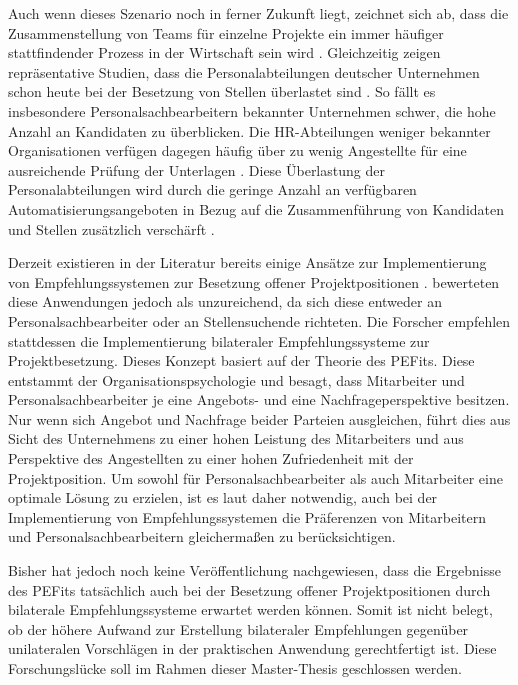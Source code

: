 Auch wenn dieses Szenario noch in ferner Zukunft liegt, zeichnet sich ab, dass die Zusammenstellung von Teams für einzelne Projekte ein immer häufiger stattfindender Prozess in der Wirtschaft sein wird \cite[S. 2]{malinowski:2008}. Gleichzeitig zeigen repräsentative Studien, dass die Personalabteilungen deutscher Unternehmen schon heute bei der Besetzung von Stellen überlastet sind \cite[S. 244]{personalbeschaffung:2017}. So fällt es insbesondere Personalsachbearbeitern bekannter Unternehmen schwer, die hohe Anzahl an Kandidaten zu überblicken. Die HR-Abteilungen weniger bekannter Organisationen verfügen dagegen häufig über zu wenig Angestellte für eine ausreichende Prüfung der Unterlagen \cite[S. 8]{hays:2013}. Diese Überlastung der Personalabteilungen wird durch die geringe Anzahl an verfügbaren Automatisierungsangeboten in Bezug auf die Zusammenführung von Kandidaten und Stellen zusätzlich verschärft \cite[S. 15]{hays:2013}.

Derzeit existieren in der Literatur bereits einige Ansätze zur Implementierung von Empfehlungssystemen zur Besetzung offener Projektpositionen \cite{malinowski:2008}. \textcite{malinowski:2008} bewerteten diese Anwendungen jedoch als unzureichend, da sich diese entweder an Personalsachbearbeiter oder an Stellensuchende richteten. Die Forscher empfehlen stattdessen die Implementierung bilateraler Empfehlungssysteme zur Projektbesetzung. Dieses Konzept basiert auf der Theorie des \acp{PEFit}. Diese entstammt der Organisationspsychologie und besagt, dass Mitarbeiter und Personalsachbearbeiter je eine Angebots- und eine Nachfrageperspektive besitzen. Nur wenn sich Angebot und Nachfrage beider Parteien ausgleichen, führt dies aus Sicht des Unternehmens zu einer hohen Leistung des Mitarbeiters und aus Perspektive des Angestellten zu einer hohen Zufriedenheit mit der Projektposition. Um sowohl für Personalsachbearbeiter als auch Mitarbeiter eine optimale Lösung zu erzielen, ist es laut \textcite{malinowski:2008} daher notwendig, auch bei der Implementierung von Empfehlungssystemen die Präferenzen von Mitarbeitern und Personalsachbearbeitern gleichermaßen zu berücksichtigen.

Bisher hat jedoch noch keine Veröffentlichung nachgewiesen, dass die Ergebnisse des \acp{PEFit} tatsächlich auch bei der Besetzung offener Projektpositionen durch bilaterale Empfehlungssysteme erwartet werden können. Somit ist nicht belegt, ob der höhere Aufwand zur Erstellung bilateraler Empfehlungen gegenüber unilateralen Vorschlägen in der praktischen Anwendung gerechtfertigt ist. Diese Forschungslücke soll im Rahmen dieser Master-Thesis geschlossen werden.

